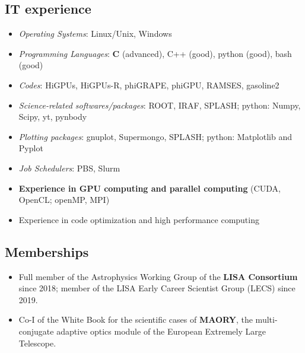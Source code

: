 \subsection*{IT experience}

\begin{itemize}

    \item\textit{Operating Systems}: Linux/Unix, Windows

    \item\textit{Programming Languages}: {\bf C } (advanced), C++ (good), python (good), bash (good)
    \item \textit{Codes}: HiGPUs, HiGPUs-R, phiGRAPE, phiGPU, RAMSES, gasoline2

    \item\textit{Science-related softwares/packages}: ROOT, IRAF, SPLASH; python: Numpy, Scipy, yt, pynbody

    \item\textit{Plotting packages}: gnuplot, Supermongo, SPLASH; python: Matplotlib and Pyplot 
    
    \item\textit{Job Schedulers}: PBS, Slurm
    
    \item\textbf{Experience in GPU computing and parallel computing} (CUDA, OpenCL; openMP, MPI)
    
    \item Experience in code optimization and high performance computing 

\end{itemize}

\subsection*{Memberships}

\begin{itemize}

    \item Full member of the {Astrophysics Working Group} of the {\bf LISA Consortium} since 2018; member of the LISA Early Career Scientist Group (LECS) since 2019.

    \item Co-I of the White Book for the scientific cases of  \textbf{MAORY}, the multi-conjugate adaptive optics module of the European Extremely Large Telescope.
    
\end{itemize}



